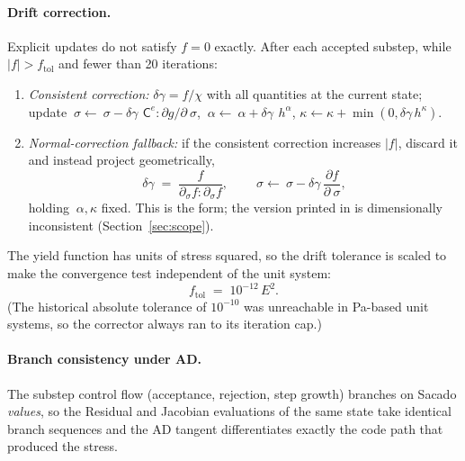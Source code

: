 \documentclass[12pt]{article}
\newcommand{\stress}{~\sigma}
\newcommand{\backstress}{~\alpha}
\newcommand{\Celast}{{~{\mathsf C}^e}}
\newcommand{\halpha}{~h^{\alpha}}
\begin{document}
\paragraph{Drift correction.}
Explicit updates do not satisfy $f = 0$ exactly. After each accepted
substep, while $|f| > f_{\mathrm{tol}}$ and fewer than 20 iterations:
\begin{enumerate}
\item \emph{Consistent correction:} $\delta\gamma = f/\chi$ with all
      quantities at the current state; update
      $\stress \leftarrow \stress
       - \delta\gamma\,\Celast:\partial g/\partial\stress$,
      $\backstress \leftarrow \backstress + \delta\gamma\,\halpha$,
      $\kappa \leftarrow \kappa + \min(0, \delta\gamma\,h^\kappa)$.
\item \emph{Normal-correction fallback:} if the consistent correction
      increases $|f|$, discard it and instead project geometrically,
      \begin{equation}
        \delta\gamma \;=\;
          \frac{f}{\partial_\sigma f : \partial_\sigma f},
        \qquad
        \stress \leftarrow \stress
          - \delta\gamma\,\frac{\partial f}{\partial\stress},
      \end{equation}
      holding $\backstress, \kappa$ fixed. This is the
      \citet{Sloan.Abbo.Sheng:2001} form; the version printed in
      \citet{Sun.Chen.Ostien:2014} is dimensionally inconsistent
      (Section~\ref{sec:scope}).
\end{enumerate}
The yield function has units of stress squared, so the drift
tolerance is scaled to make the convergence test independent of the
unit system:
\begin{equation}
  f_{\mathrm{tol}} \;=\; 10^{-12}\,E^2 .
\end{equation}
(The historical absolute tolerance of $10^{-10}$ was unreachable in
Pa-based unit systems, so the corrector always ran to its iteration
cap.)

\paragraph{Branch consistency under AD.}
The substep control flow (acceptance, rejection, step growth)
branches on Sacado \emph{values}, so the Residual and Jacobian
evaluations of the same state take identical branch sequences and the
AD tangent differentiates exactly the code path that produced the
stress.
\end{document}
